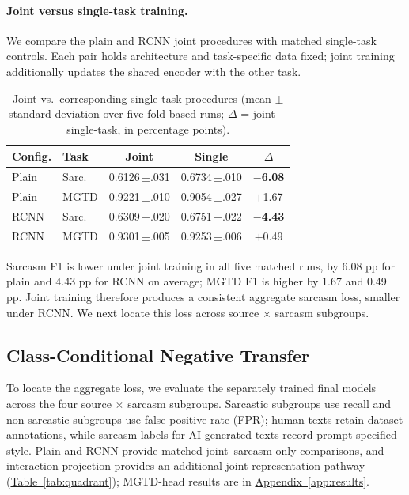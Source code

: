 \documentclass[11pt]{article}
\newcommand{\Appref}[1]{\hyperref[#1]{Appendix~\ref*{#1}}}
\newcommand{\Tabref}[1]{\hyperref[#1]{Table~\ref*{#1}}}
\begin{document}
\label{sec:ablation}\paragraph{Joint versus single-task training.} We compare the plain and RCNN joint procedures with matched single-task controls. Each pair holds architecture and task-specific data fixed; joint training additionally updates the shared encoder with the other task.

\begin{table}[t]
  \centering
  \footnotesize
  \setlength{\tabcolsep}{2pt}
  \begin{tabular}{@{}llccc@{}}
    \toprule
    \textbf{Config.} & \textbf{Task} & \textbf{Joint} & \textbf{Single} & \textbf{$\Delta$} \\
    \midrule
    Plain & Sarc. & 0.6126\,$\pm$.031 & 0.6734\,$\pm$.010 & \textbf{$-$6.08} \\
    Plain & MGTD & 0.9221\,$\pm$.010 & 0.9054\,$\pm$.027 & $+$1.67 \\
    RCNN  & Sarc. & 0.6309\,$\pm$.020 & 0.6751\,$\pm$.022 & \textbf{$-$4.43} \\
    RCNN  & MGTD & 0.9301\,$\pm$.005 & 0.9253\,$\pm$.006 & $+$0.49 \\
    \bottomrule
  \end{tabular}
  \caption{Joint vs.\ corresponding single-task procedures (mean $\pm$ standard deviation over five fold-based runs; $\Delta$ = joint $-$ single-task, in percentage points).}
  \label{tab:ablation}
\end{table}

Sarcasm F1 is lower under joint training in all five matched runs, by 6.08 pp for plain and 4.43 pp for RCNN on average; MGTD F1 is higher by 1.67 and 0.49 pp. Joint training therefore produces a consistent aggregate sarcasm loss, smaller under RCNN. We next locate this loss across source $\times$ sarcasm subgroups.

\subsection{Class-Conditional Negative Transfer}
\label{sec:quadrant}
\label{sec:quadrant-results}

To locate the aggregate loss, we evaluate the separately trained final models across the four source $\times$ sarcasm subgroups. Sarcastic subgroups use recall and non-sarcastic subgroups use false-positive rate (FPR); human texts retain dataset annotations, while sarcasm labels for AI-generated texts record prompt-specified style. Plain and RCNN provide matched joint--sarcasm-only comparisons, and interaction-projection provides an additional joint representation pathway (\Tabref{tab:quadrant}); MGTD-head results are in \Appref{app:results}.
\end{document}
